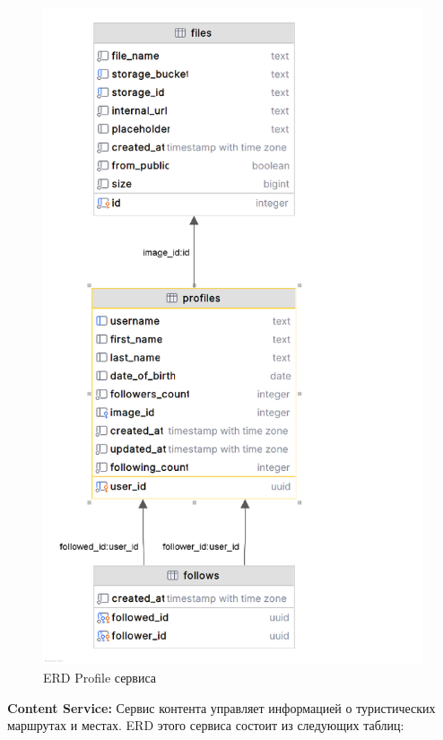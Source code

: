 \begin{figure}[H]
        \centering
        \includegraphics[width=0.8\linewidth]{Images/second_chapter_backend_architecture/Picture11.png}
        \caption{ERD Profile сервиса}
        \label{fig:profile-service-erd}
\end{figure}

\textbf{Content Service:} Сервис контента управляет информацией о туристических маршрутах и местах. ERD этого сервиса состоит из следующих таблиц:

